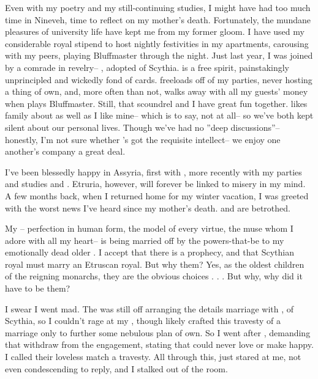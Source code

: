 \documentclass[char]{Kos}
\begin{document}
Even with my poetry and my still-continuing studies, I might have had too much time in Nineveh, time to reflect on my mother's death. Fortunately, the mundane pleasures of university life have kept me from my former gloom. I have used my considerable royal stipend to host nightly festivities in my apartments, carousing with my peers, playing Bluffmaster through the night. Just last year, I was joined by a comrade in revelry-- \cWard{}, adopted \cWard{\prince} of Scythia. \cWard{} is a free spirit, painstakingly unprincipled and wickedly fond of cards. \cWard{\They} freeloads off of my parties, never hosting a thing of \cWard{\their} own, and, more often than not, \cWard{\they} walks away with all my guests' money when \cWard{\they} plays Bluffmaster. Still, that scoundrel and I have great fun together. \cWard{} likes \cWard{\their} family about as well as I like mine-- which is to say, not at all-- so we've both kept silent about our personal lives. Though we've had no ''deep discussions''-- honestly, I'm not sure whether \cWard{\they}'s got the requisite intellect-- we enjoy one another's company a great deal.

I've been blessedly happy in Assyria, first with \cBride{}, more recently with my parties and studies and \cWard{}. Etruria, however, will forever be linked to misery in my mind. A few months back, when I returned home for my winter vacation, I was greeted with the worst news I've heard since my mother's death. \cBride{} and \cGroom{} are betrothed.

My \cBride{}-- perfection in human form, the model of every virtue, the muse whom I adore with all my heart-- is being married off by the powers-that-be to my emotionally dead older \cGroom{\sibling}. I accept that there is a prophecy, and that Scythian royal must marry an Etruscan royal. But why them? Yes, as the oldest children of the reigning monarchs, they are the obvious choices . . . But why, why did it have to be them? 

I swear I went mad. The \cEtruriaKing{\monarch} was still off arranging the details marriage with \cScythiaKing{}, \cScythiaKing{\monarch} of Scythia, so I couldn't rage at my \cEtruriaKing{\parent}, though \cEtruriaKing{\they} likely crafted this travesty of a marriage only to further some nebulous plan of \cScythiaKing{\their} own. So I went after \cGroom{}, demanding that \cGroom{\they} withdraw from the engagement, stating that \cGroom{\they} could never love \cBride{} or make \cBride{\them} happy. I called their loveless match a travesty. All through this, \cGroom{\they} just stared at me, not even condescending to reply, and I stalked out of the room.
\end{document}
